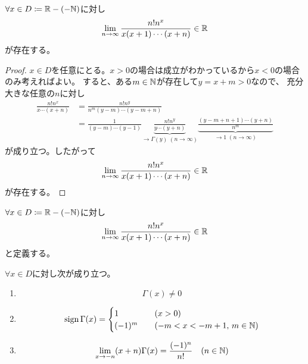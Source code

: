 \documentclass[report]{jlreq}
\begin{document}
    \begin{proposition}
        $\forall x \in D \coloneqq \mathbb{R} - (- \mathbb{N})$に対し
        \begin{equation}
            \lim_{n \to \infty} \frac{n! n^x}{x(x + 1) \cdots (x + n)} \in \mathbb{R}
        \end{equation}
        が存在する。
        \label{11:prop:1}
    \end{proposition}

\begin{proof}
    $x \in D$を任意にとる。$x > 0$の場合は成立がわかっているから$x < 0$の場合のみ考えればよい。
    すると、ある$m \in \mathbb{N}$が存在して$y = x + m > 0$なので、
    充分大きな任意の$n$に対し
    \begin{equation}
        \begin{split}
            \frac{n! n^x}{x \cdots (x + n)}
                &= \frac{n! n^y}{n^m (y - m) \cdots (y - m + n)} \\
                &= \frac{1}{(y - m) \cdots (y - 1)}
                    \underbrace{\frac{n! n^y}{y \cdots (y + n)}}_{\to \Gamma(y)\; (n \to \infty)}
                    \underbrace{\frac{(y - m + n + 1) \cdots (y + n)}{n^m}}_{\to 1\; (n \to \infty)}
        \end{split}
    \end{equation}
    が成り立つ。したがって
    \begin{equation}
        \lim_{n \to \infty} \frac{n! n^x}{x(x + 1) \cdots (x + n)} \in \mathbb{R}
    \end{equation}
    が存在する。
\end{proof}

\begin{definition}
    $\forall x \in D \coloneqq \mathbb{R} - (- \mathbb{N})$に対し
    \begin{equation}
        \lim_{n \to \infty} \frac{n! n^x}{x(x + 1) \cdots (x + n)} \in \mathbb{R}
    \end{equation}
    と定義する。
\end{definition}

\begin{proposition}
    $\forall x \in D$に対し次が成り立つ。
    \begin{enumerate}
        \item \begin{equation}
            \Gamma(x) \neq 0
        \end{equation}
        \item \begin{equation}
            \mathrm{sign}\, \Gamma(x) = \begin{cases}
                1 \quad &(x > 0) \\
                (-1)^m \quad &(-m < x < -m+1,\, m \in \mathbb{N})
            \end{cases}
        \end{equation}
        \item \begin{equation}
            \lim_{x \to -n} (x + n) \Gamma(x) = \frac{(-1)^n}{n!} \quad (n \in \mathbb{N})
        \end{equation}
    \end{enumerate}
\end{proposition}
\end{document}
